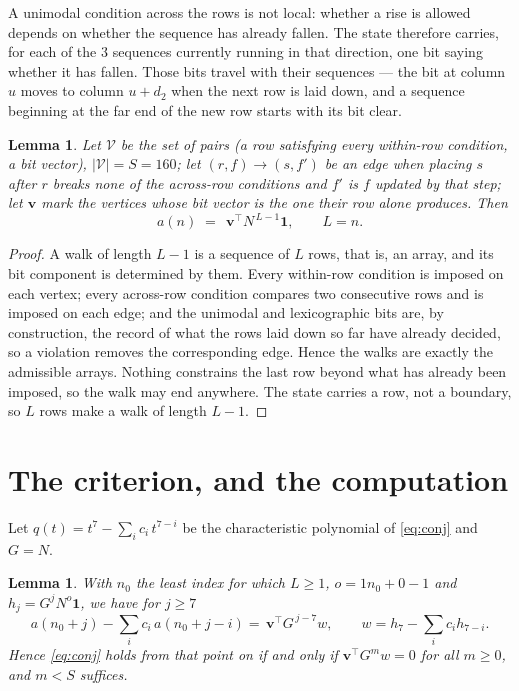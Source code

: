 \documentclass[11pt,a4paper]{article}
\theoremstyle{plain}
\newtheorem{lemma}[theorem]{Lemma}
\theoremstyle{definition}
\begin{document}
A unimodal condition across the rows is not local: whether a
rise is allowed depends on whether the sequence has already fallen. The state therefore
carries, for each of the $3$ sequences currently running in that direction, one bit saying
whether it has fallen. Those bits travel with their sequences --- the bit at column $u$
moves to column $u+d_2$ when the next row is laid down, and a sequence beginning at the
far end of the new row starts with its bit clear.

\begin{lemma}\label{lem:walk}
Let $\mathcal V$ be the set of pairs (a row satisfying every within-row condition, a
bit vector), $|\mathcal V|=S=160$; let $(r,f)\to(s,f')$ be an edge when placing $s$ after $r$
breaks none of the across-row conditions and $f'$ is $f$ updated by that step; let
$\mathbf{v}$ mark the vertices whose bit vector is the one their row alone produces.
Then
\[
a(n)\;=\;\,\mathbf{v}^{\!\top}N^{\,L-1}\mathbf{1},\qquad L=n.
\]
\end{lemma}

\begin{proof}
A walk of length $L-1$ is a sequence of $L$ rows, that is, an array, and its bit component
is determined by them. Every within-row condition is imposed on each vertex; every
across-row condition compares two consecutive rows and is imposed on each edge; and the
unimodal and lexicographic bits are, by construction, the record of what the rows laid down
so far have already decided, so a violation removes the corresponding edge. Hence the walks
are exactly the admissible arrays. Nothing constrains the last row beyond what has already
been imposed, so the walk may end anywhere. The state carries a row, not a boundary, so
$L$ rows make a walk of length $L-1$.
\end{proof}

\section{The criterion, and the computation}

Let $q(t)=t^{7}-\sum_i c_i\,t^{7-i}$ be the characteristic polynomial of
\eqref{eq:conj} and $G=N$.

\begin{lemma}\label{lem:crit}
With $n_0$ the least index for which $L\ge1$, $o=1n_0+0-1$ and
$h_j=G^{j}N^{o}\mathbf{1}$, we have for $j\ge7$
\[
a(n_0+j)-\sum_i c_i\,a(n_0+j-i)=\,\mathbf{v}^{\!\top}G^{\,j-7}w,
\qquad w=h_{7}-\sum_i c_ih_{7-i} .
\]
Hence \eqref{eq:conj} holds from that point on if and only if
$\mathbf{v}^{\!\top}G^{m}w=0$ for all $m\ge0$, and $m<S$ suffices.
\end{lemma}
\end{document}
